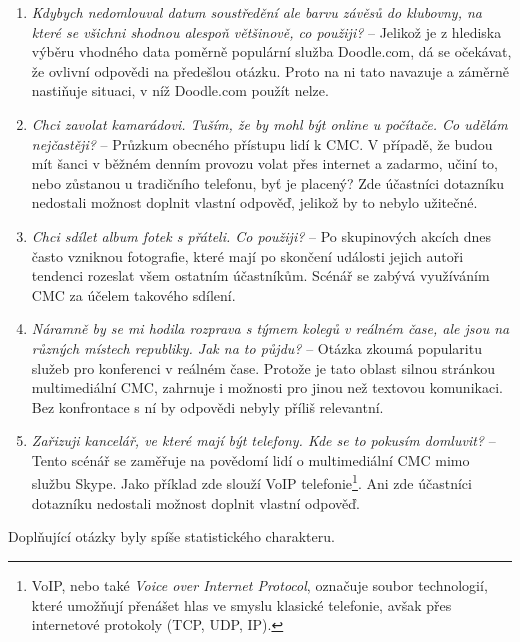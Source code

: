 \documentclass[12pt,oneside,final]{fithesis2}
\begin{document}
\begin{enumerate}
    \item \emph{Kdybych nedomlouval datum soustředění ale barvu závěsů do klubovny, na které se všichni shodnou alespoň většinově, co použiji?} --
        Jelikož je z hlediska výběru vhodného data poměrně populární služba Doodle.com, dá se očekávat, že ovlivní odpovědi na předešlou otázku. Proto na ni tato navazuje a záměrně nastiňuje situaci, v níž Doodle.com použít nelze.

    \item \emph{Chci zavolat kamarádovi. Tuším, že by mohl být online u počítače. Co udělám nejčastěji?} --
        Průzkum obecného přístupu lidí k CMC. V případě, že budou mít šanci v běžném denním provozu volat přes internet a zadarmo, učiní to, nebo zůstanou u tradičního telefonu, byť je placený? Zde účastníci dotazníku nedostali možnost doplnit vlastní odpověď, jelikož by to nebylo užitečné.

    \item \emph{Chci sdílet album fotek s přáteli. Co použiji?} --
        Po skupinových akcích dnes často vzniknou fotografie, které mají po skončení události jejich autoři tendenci rozeslat všem ostatním účastníkům. Scénář se zabývá využíváním CMC za účelem takového sdílení.

    \item \emph{Náramně by se mi hodila rozprava s týmem kolegů v reálném čase, ale jsou na různých místech republiky. Jak na to půjdu?} --
        Otázka zkoumá popularitu služeb pro konferenci v reálném čase. Protože je tato oblast silnou stránkou multimediální CMC, zahrnuje i možnosti pro jinou než textovou komunikaci. Bez konfrontace s ní by odpovědi nebyly příliš relevantní.

    \item \emph{Zařizuji kancelář, ve které mají být telefony. Kde se to pokusím domluvit?} --
        Tento scénář se zaměřuje na povědomí lidí o multimediální CMC mimo službu Skype. Jako příklad zde slouží VoIP telefonie\footnote{VoIP, nebo také \emph{Voice over Internet Protocol}, označuje soubor technologií, které umožňují přenášet hlas ve smyslu klasické telefonie, avšak přes internetové protokoly (TCP, UDP, IP).}. Ani zde účastníci dotazníku nedostali možnost doplnit vlastní odpověď.
\end{enumerate}

Doplňující otázky byly spíše statistického charakteru.
\end{document}
